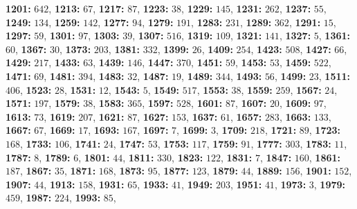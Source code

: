 \textsf{\bfseries 1201:} $642$, \textsf{\bfseries 1213:} $67$, \textsf{\bfseries 1217:} $87$, \textsf{\bfseries 1223:} $38$, \textsf{\bfseries 1229:} $145$, 
\textsf{\bfseries 1231:} $262$, \textsf{\bfseries 1237:} $55$, \textsf{\bfseries 1249:} $134$, \textsf{\bfseries 1259:} $142$, \textsf{\bfseries 1277:} $94$, \textsf{\bfseries 1279:} $191$, \textsf{\bfseries 1283:} $231$, \textsf{\bfseries 1289:} $362$, \textsf{\bfseries 1291:} $15$, \textsf{\bfseries 1297:} $59$, \textsf{\bfseries 1301:} $97$, \textsf{\bfseries 1303:} $39$, \textsf{\bfseries 1307:} $516$, \textsf{\bfseries 1319:} $109$, \textsf{\bfseries 1321:} $141$, \textsf{\bfseries 1327:} $5$, \textsf{\bfseries 1361:} $60$, \textsf{\bfseries 1367:} $30$, \textsf{\bfseries 1373:} $203$, \textsf{\bfseries 1381:} $332$, \textsf{\bfseries 1399:} $26$, \textsf{\bfseries 1409:} $254$, \textsf{\bfseries 1423:} $508$, \textsf{\bfseries 1427:} $66$, \textsf{\bfseries 1429:} $217$, \textsf{\bfseries 1433:} $63$, \textsf{\bfseries 1439:} $146$, \textsf{\bfseries 1447:} $370$, \textsf{\bfseries 1451:} $59$, \textsf{\bfseries 1453:} $53$, \textsf{\bfseries 1459:} $522$, \textsf{\bfseries 1471:} $69$, \textsf{\bfseries 1481:} $394$, \textsf{\bfseries 1483:} $32$, \textsf{\bfseries 1487:} $19$, \textsf{\bfseries 1489:} $344$, \textsf{\bfseries 1493:} $56$, \textsf{\bfseries 1499:} $23$, \textsf{\bfseries 1511:} $406$, \textsf{\bfseries 1523:} $28$, \textsf{\bfseries 1531:} $12$, \textsf{\bfseries 1543:} $5$, \textsf{\bfseries 1549:} $517$, \textsf{\bfseries 1553:} $38$, \textsf{\bfseries 1559:} $259$, \textsf{\bfseries 1567:} $24$, \textsf{\bfseries 1571:} $197$, \textsf{\bfseries 1579:} $38$, \textsf{\bfseries 1583:} $365$, \textsf{\bfseries 1597:} $528$, \textsf{\bfseries 1601:} $87$, \textsf{\bfseries 1607:} $20$, \textsf{\bfseries 1609:} $97$, \textsf{\bfseries 1613:} $73$, \textsf{\bfseries 1619:} $207$, \textsf{\bfseries 1621:} $87$, \textsf{\bfseries 1627:} $153$, \textsf{\bfseries 1637:} $61$, \textsf{\bfseries 1657:} $283$, \textsf{\bfseries 1663:} $133$, \textsf{\bfseries 1667:} $67$, \textsf{\bfseries 1669:} $17$, \textsf{\bfseries 1693:} $167$, \textsf{\bfseries 1697:} $7$, \textsf{\bfseries 1699:} $3$, \textsf{\bfseries 1709:} $218$, \textsf{\bfseries 1721:} $89$, \textsf{\bfseries 1723:} $168$, \textsf{\bfseries 1733:} $106$, \textsf{\bfseries 1741:} $24$, \textsf{\bfseries 1747:} $53$, \textsf{\bfseries 1753:} $117$, \textsf{\bfseries 1759:} $91$, \textsf{\bfseries 1777:} $303$, \textsf{\bfseries 1783:} $11$, \textsf{\bfseries 1787:} $8$, \textsf{\bfseries 1789:} $6$, \textsf{\bfseries 1801:} $44$, \textsf{\bfseries 1811:} $330$, \textsf{\bfseries 1823:} $122$, \textsf{\bfseries 1831:} $7$, \textsf{\bfseries 1847:} $160$, \textsf{\bfseries 1861:} $187$, \textsf{\bfseries 1867:} $35$, \textsf{\bfseries 1871:} $168$, \textsf{\bfseries 1873:} $95$, \textsf{\bfseries 1877:} $123$, \textsf{\bfseries 1879:} $44$, \textsf{\bfseries 1889:} $156$, \textsf{\bfseries 1901:} $152$, \textsf{\bfseries 1907:} $44$, \textsf{\bfseries 1913:} $158$, \textsf{\bfseries 1931:} $65$, \textsf{\bfseries 1933:} $41$, \textsf{\bfseries 1949:} $203$, \textsf{\bfseries 1951:} $41$, \textsf{\bfseries 1973:} $3$, \textsf{\bfseries 1979:} $459$, \textsf{\bfseries 1987:} $224$, \textsf{\bfseries 1993:} $85$, 
